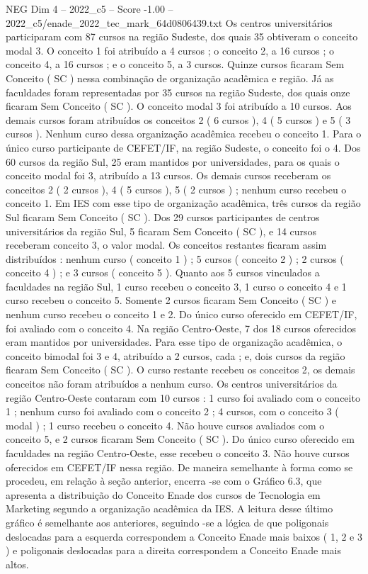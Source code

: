 \begin{textsample}{NEG Dim 4 – 2022\_c5 – Score -1.00 – 2022\_c5/enade\_2022\_tec\_mark\_64d0806439.txt}
Os centros universitários participaram com 87 cursos na região Sudeste, dos quais 35 obtiveram o conceito modal 3.
O conceito 1 foi atribuído a 4 cursos ; o conceito 2, a 16 cursos ; o conceito 4, a 16 cursos ; e o conceito 5, a 3 cursos.
Quinze cursos ficaram Sem Conceito ( SC ) nessa combinação de organização acadêmica e região.
Já as faculdades foram representadas por 35 cursos na região Sudeste, dos quais onze ficaram Sem Conceito ( SC ).
O conceito modal 3 foi atribuído a 10 cursos.
Aos demais cursos foram atribuídos os conceitos 2 ( 6 cursos ), 4 ( 5 cursos ) e 5 ( 3 cursos ).
Nenhum curso dessa organização acadêmica recebeu o conceito 1.
Para o único curso participante de CEFET/IF, na região Sudeste, o conceito foi o 4.
Dos 60 cursos da região Sul, 25 eram mantidos por universidades, para os quais o conceito modal foi 3, atribuído a 13 cursos.
Os demais cursos receberam os conceitos 2 ( 2 cursos ), 4 ( 5 cursos ), 5 ( 2 cursos ) ; nenhum curso recebeu o conceito 1.
Em IES com esse tipo de organização acadêmica, três cursos da região Sul ficaram Sem Conceito ( SC ).
Dos 29 cursos participantes de centros universitários da região Sul, 5 ficaram Sem Conceito ( SC ), e 14 cursos receberam conceito 3, o valor modal.
Os conceitos restantes ficaram assim distribuídos : nenhum curso ( conceito 1 ) ; 5 cursos ( conceito 2 ) ; 2 cursos ( conceito 4 ) ; e 3 cursos ( conceito 5 ).
Quanto aos 5 cursos vinculados a faculdades na região Sul, 1 curso recebeu o conceito 3, 1 curso o conceito 4 e 1 curso recebeu o conceito 5.
Somente 2 cursos ficaram Sem Conceito ( SC ) e nenhum curso recebeu o conceito 1 e 2.
Do único curso oferecido em CEFET/IF, foi avaliado com o conceito 4.
Na região Centro-Oeste, 7 dos 18 cursos oferecidos eram mantidos por universidades.
Para esse tipo de organização acadêmica, o conceito bimodal foi 3 e 4, atribuído a 2 cursos, cada ; e, dois cursos da região ficaram Sem Conceito ( SC ).
O curso restante recebeu os conceitos 2, os demais conceitos não foram atribuídos a nenhum curso.
Os centros universitários da região Centro-Oeste contaram com 10 cursos : 1 curso foi avaliado com o conceito 1 ; nenhum curso foi avaliado com o conceito 2 ; 4 cursos, com o conceito 3 ( modal ) ; 1 curso recebeu o conceito 4.
Não houve cursos avaliados com o conceito 5, e 2 cursos ficaram Sem Conceito ( SC ).
Do único curso oferecido em faculdades na região Centro-Oeste, esse recebeu o conceito 3.
Não houve cursos oferecidos em CEFET/IF nessa região.
De maneira semelhante à forma como se procedeu, em relação à seção anterior, encerra -se com o Gráfico 6.3, que apresenta a distribuição do Conceito Enade dos cursos de Tecnologia em Marketing segundo a organização acadêmica da IES.
A leitura desse último gráfico é semelhante aos anteriores, seguindo -se a lógica de que poligonais deslocadas para a esquerda correspondem a Conceito Enade mais baixos ( 1, 2 e 3 ) e poligonais deslocadas para a direita correspondem a Conceito Enade mais altos.

\end{textsample}
